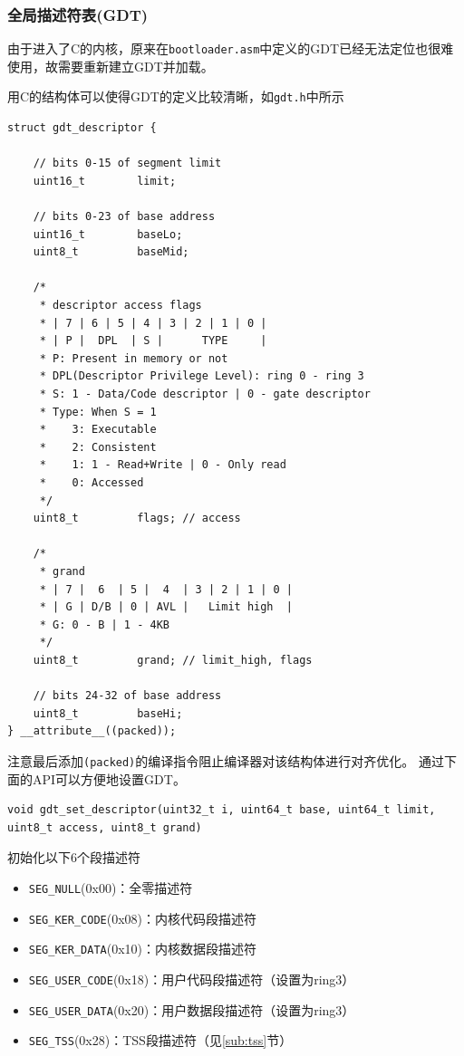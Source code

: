\documentclass[logo,reportComp]{thesis}
\begin{document}
\subsubsection{全局描述符表(GDT)}
由于进入了C的内核，原来在\verb'bootloader.asm'中定义的GDT已经无法定位也很难使用，故需要重新建立GDT并加载。

用C的结构体可以使得GDT的定义比较清晰，如\verb'gdt.h'中所示
\begin{lstlisting}
struct gdt_descriptor {

	// bits 0-15 of segment limit
	uint16_t		limit;

	// bits 0-23 of base address
	uint16_t		baseLo;
	uint8_t			baseMid;

	/*
	 * descriptor access flags
	 * | 7 | 6 | 5 | 4 | 3 | 2 | 1 | 0 |
	 * | P |  DPL  | S |      TYPE     |
	 * P: Present in memory or not
	 * DPL(Descriptor Privilege Level): ring 0 - ring 3
	 * S: 1 - Data/Code descriptor | 0 - gate descriptor
	 * Type: When S = 1
	 *    3: Executable
	 *    2: Consistent
	 *    1: 1 - Read+Write | 0 - Only read
	 *    0: Accessed
	 */
	uint8_t			flags; // access

	/*
	 * grand
	 * | 7 |  6  | 5 |  4  | 3 | 2 | 1 | 0 |
	 * | G | D/B | 0 | AVL |   Limit high  |
	 * G: 0 - B | 1 - 4KB
	 */
	uint8_t			grand; // limit_high, flags

	// bits 24-32 of base address
	uint8_t			baseHi;
} __attribute__((packed));
\end{lstlisting}

注意最后添加\verb'(packed)'的编译指令阻止编译器对该结构体进行对齐优化。
通过下面的API可以方便地设置GDT。
\begin{lstlisting}
void gdt_set_descriptor(uint32_t i, uint64_t base, uint64_t limit, uint8_t access, uint8_t grand)
\end{lstlisting}

初始化以下6个段描述符
\begin{itemize}
	\item \verb'SEG_NULL'(0x00)：全零描述符
	\item \verb'SEG_KER_CODE'(0x08)：内核代码段描述符
	\item \verb'SEG_KER_DATA'(0x10)：内核数据段描述符
	\item \verb'SEG_USER_CODE'(0x18)：用户代码段描述符（设置为ring3）
	\item \verb'SEG_USER_DATA'(0x20)：用户数据段描述符（设置为ring3）
	\item \verb'SEG_TSS'(0x28)：TSS段描述符（见\ref{sub:tss}节）
\end{itemize}
\end{document}
